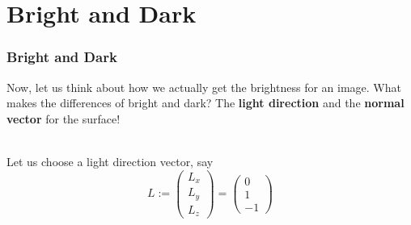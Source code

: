 \documentclass[12pt, t]{beamer}
\newcommand{\nullspace}{~\\[15pt]}
\begin{document}

\section{Bright and Dark}
\begin{frame}
    \frametitle{Bright and Dark}

    Now, let us think about how we actually get the brightness for an image. What makes the 
    differences of bright and dark? The \textbf{light direction} and the \textbf{normal vector} for 
    the surface!

    \nullspace
    Let us choose a light direction vector, say 
    \begin{equation*}
        L :=
        \begin{pmatrix}
            L_x \\
            L_y \\
            L_z
        \end{pmatrix}
        =
        \begin{pmatrix}
            0   \\
            1   \\
            -1  
        \end{pmatrix}
    \end{equation*}

\end{frame}

\end{document}
